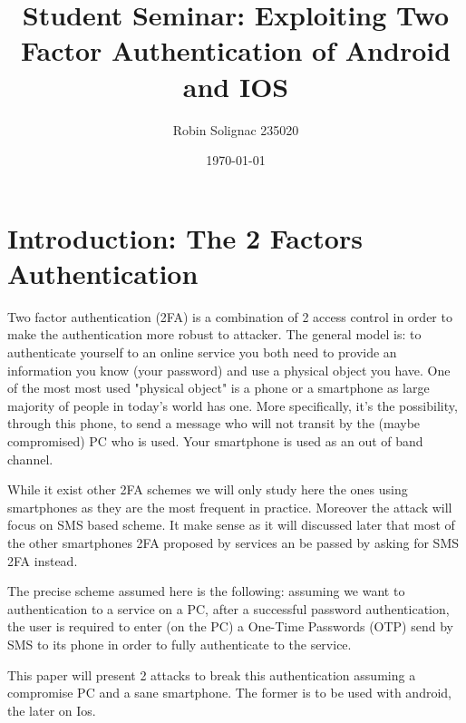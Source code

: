 \documentclass[11pt, a4paper,twocolumn]{article}
\title{Student Seminar: Exploiting Two Factor Authentication of Android and IOS}
\author{Robin Solignac 235020}
\date{\today}
\begin{document}
\maketitle
\begin{comment}
\begin{abstract}
Applications  which  can  be  used  in  different  platforms  now  use  two
factor authentication (2FA) to allow users to conveniently switch from one platform to another.
For example, when a user tries to login his gmail, it is not enough to enter correct password 
(first factor), it is also necessary to enter a PIN which is received by an SMS (second factor).
The aim of this project explaining the attacks against 2FA in IOS and Android devices and 
what can be the solutions. 
\end{abstract}
\end{comment}

\section{Introduction: The 2 Factors Authentication}

Two factor authentication (2FA) is a combination of 2 access control  in order to make the authentication more robust to attacker. The general model is: to authenticate yourself to an online service you both need to provide an information you know (your password) and use a physical object you have. 
One of the most most used "physical object" is a phone or a smartphone as large majority of people in today's world has one.
More specifically, it's the possibility, through this phone, to send a message who will not transit by the (maybe compromised) PC who is used. Your smartphone is used as an out of band channel.

While it exist other 2FA schemes we will only study here the ones using smartphones as they are the most frequent in practice. Moreover the attack will focus on SMS based scheme.
It make sense as it will discussed later that most of the other smartphones 2FA proposed by services an be passed by asking for SMS 2FA instead.

The precise scheme assumed here is the following: assuming we want to authentication to a service on a PC, after a successful password authentication, the user is required to enter (on the PC) a One-Time Passwords (OTP) send by SMS to its phone in order to fully authenticate to the service. 

This paper will present 2 attacks to break this authentication assuming a compromise PC and a sane smartphone. The former is to be used with android, the later on Ios.
\end{document}

